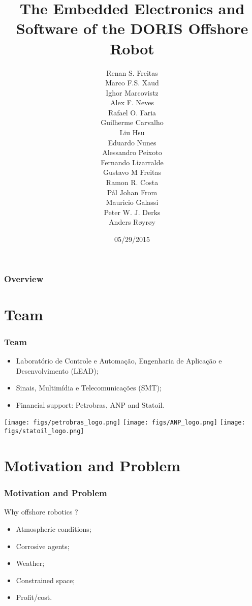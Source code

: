 \documentclass{beamer}%
\title{The Embedded Electronics and Software of the DORIS Offshore Robot}
\author[Renan S. Freitas]{\parbox[t]{4cm}{Renan S. Freitas\\ Marco F.S.
Xaud\\ Ighor Marcovistz\\ Alex F.
Neves\\ Rafael O. Faria\\ Guilherme Carvalho\\ Liu Hsu\\
Eduardo Nunes}\parbox[t]{4cm}{ Alessandro Peixoto \\ Fernando
Lizarralde\\
Gustavo M Freitas\\ Ramon R. Costa\\ Pål Johan From\\ Mauricio Galassi\\ Peter W. J.
Derks\\ Anders Røyrøy}}
\institute{UFRJ, PETROBRAS and STATOIL}
\date{05/29/2015}
\begin{document}
\frame{\titlepage \vspace{-0.5cm} 

}

\frame
{
\frametitle{Overview}
\tableofcontents%
}

\section{Team}

\frame
{
\frametitle{Team}
\begin{itemize}
  \item Laboratório de Controle e Automação, Engenharia de Aplicação e
Desenvolvimento (LEAD);
  \item Sinais, Multimídia e Telecomunicações (SMT);
  \item Financial support: Petrobras, ANP and Statoil.
\end{itemize}
\texttt{[image: figs/petrobras\_logo.png]}\hspace*{1cm}
\texttt{[image: figs/ANP\_logo.png]}\hspace*{1cm}
\texttt{[image: figs/statoil\_logo.png]} 
}
 
\section{Motivation and Problem}

\frame
{
\frametitle{Motivation and Problem}
\vspace*{0.5cm}
\begin{center}
Why offshore robotics ?
\end{center}
\begin{itemize}[<+->]
  \item Atmospheric conditions;
  \item Corrosive agents;
  \item Weather;
  \item Constrained space;
  \item Profit/cost.
\end{itemize}
}
\end{document}
